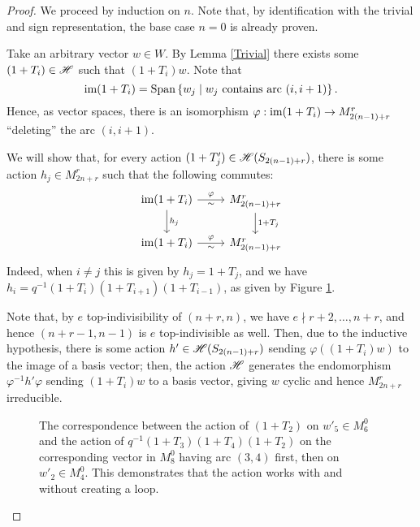 \documentclass{amsart}
\begin{document}
\begin{proof}
  We proceed by induction on $n$.
  Note that, by identification with the trivial and sign representation, the base case $n = 0$ is already proven.

  Take an arbitrary vector $w \in W$.
  By Lemma \ref{Trivial} there exists some $(1 + T_i) \in \mathscr{H}$ such that $(1 + T_i)w$.
  Note that \[\text{im} (1 + T_i) = \text{Span}\left\{ w_j \mid w_j \text{ contains arc }(i,i+1) \right\}.\]
  Hence, as vector spaces, there is an isomorphism $\varphi:\text{im}(1 + T_i) \rightarrow M_{2(n-1) + r}^r$ ``deleting'' the arc $(i,i+1)$.

  We will show that, for every action $(1 + T_j') \in \mathscr{H}(S_{2(n-1) + r})$, there is some action $h_j \in M_{2n + r}^r$ such that the following commutes:
  \[
    \begin{tikzcd}
      \ima (1 + T_i) \arrow[r,"\varphi" above, "\sim" below] \arrow[d,"h_j"] & M_{2(n-1) + r}^r \arrow[d,"1 + T_j"]\\
      \ima (1 + T_i) \arrow[r,"\varphi" above, "\sim" below] & M_{2(n-1) + r}^r
    \end{tikzcd}
  \]
  Indeed, when $i \neq j$ this is given by $h_j = 1 + T_j$, and we have $h_i = q^{-1}(1 + T_i)(1 + T_{i+1})(1 + T_{i-1})$, as given by Figure \ref{bigloop}.
  
  Note that, by $e$ top-indivisibility of $(n+r,n)$, we have $e \nmid r+2,\dots,n+r$, and hence $(n+r-1,n-1)$ is $e$ top-indivisible as well.
  Then, due to the inductive hypothesis, there is some action $h' \in \mathscr{H}(S_{2(n-1) + r})$ sending $\varphi((1 + T_i)w)$ to the image of a basis vector;
  then, the action $\mathscr{H}$ generates the endomorphism $\varphi^{-1}h'\varphi$ sending $(1 + T_i)w$ to a basis vector, giving $w$ cyclic and hence $M_{2n + r}^r$ irreducible.
  \begin{figure}
  \begin{adjustbox}{width=\textwidth}
     \hspace{20pt} 
  \end{adjustbox}
  \begin{adjustbox}{width=\textwidth}
     \hspace{20pt}
\end{adjustbox}
  \caption{The correspondence between the action of $(1 + T_2)$ on $w'_5 \in M^0_6$ and the action of $q^{-1}(1 + T_3)(1 + T_4)(1 + T_2)$ on the corresponding vector in $M^0_8$ having arc $(3,4)$ first, then on $w'_2 \in M^0_4$.
  This demonstrates that the action works with and without creating a loop.
  }
  \label{bigloop}
  \end{figure}
\end{proof}
\end{document}

